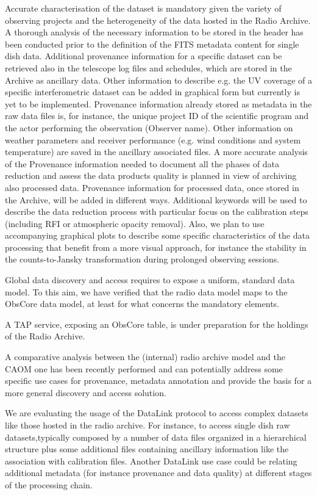\documentclass[11pt,a4paper]{ivoa}
\begin{document}
Accurate characterisation of the dataset is mandatory given the variety of observing projects and the heterogeneity of the data hosted in the Radio Archive. A thorough analysis of the necessary information to be stored in the header has been conducted prior to the definition of the FITS metadata content for single dish data. Additional provenance information for a specific dataset can be retrieved also in the telescope log files and schedules, which are stored in the Archive as ancillary data. Other information to describe e.g. the UV coverage of a specific interferometric dataset can be added in graphical form but currently is yet to be implemented. Provenance information already stored as metadata in the raw data files is, for instance, the unique project ID of the scientific program and the actor performing the observation (Observer name). Other information on weather parameters and receiver performance (e.g. wind conditions and system temperature) are saved in the ancillary associated files.
A more accurate analysis of the Provenance information needed to document all the phases of data reduction and assess the data products quality is planned in view of archiving also processed data.  Provenance information for processed data, once stored in the Archive, will be added in different ways. Additional keywords will be used to describe the data reduction process with particular focus on the calibration steps (including RFI or atmospheric opacity removal). Also, we plan to use accompanying graphical plots to describe some specific characteristics of the data processing that benefit from a more visual approach, for instance the stability in the counts-to-Jansky transformation during prolonged observing sessions.

Global data discovery and access requires to expose a uniform, standard data model. To this aim, we have verified that the radio data model maps to the ObsCore data model, at least  for what concerns the mandatory elements.

A TAP service, exposing an ObsCore table, is under preparation for the holdings of the Radio Archive.

A comparative analysis between the (internal) radio archive model and the CAOM one has been recently performed and can potentially address some specific use cases for provenance, metadata annotation and provide the basis for a more general discovery and access solution.

We are evaluating the usage of the DataLink protocol to access complex datasets like those hosted in the radio archive. For instance, to access single dish raw datasets,typically composed by a number of data files organized in a hierarchical structure plus some additional files containing ancillary information like the association with calibration files. Another DataLink use case could be relating additional metadata (for instance provenance and data quality) at different stages of the processing chain.
\end{document}
